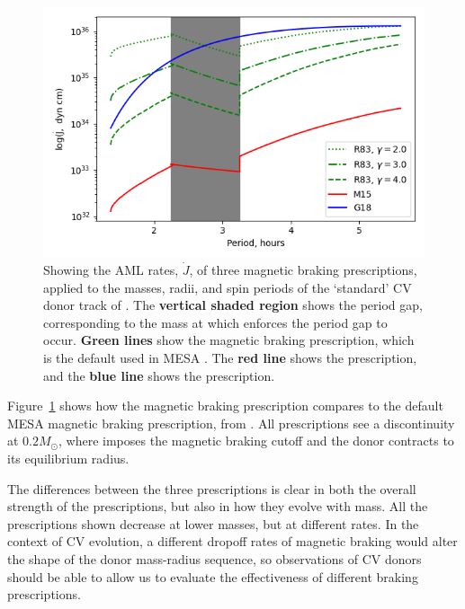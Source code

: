 \begin{figure}
    \centering
    \includegraphics[width=\textwidth, trim={1cm 0 0 0}]{figures/introduction/rappaport_garraffo_matt_magbraking_period.png}
    \caption{Showing the AML rates, $\dot J$, of three magnetic braking prescriptions, applied to the masses, radii, and spin periods of the `standard' CV donor track of \citet{knigge11}. The {\bf vertical shaded region} shows the period gap, corresponding to the mass at which \citet{knigge11} enforces the period gap to occur. {\bf Green lines} show the \citet{rappaport1983} magnetic braking prescription, which is the default used in MESA \citep{Paxton_2015}. The {\bf red line} shows the \citet{matt2015} prescription, and the {\bf blue line} shows the \citet{garraffo2018a} prescription.}
    \label{fig:introduction:rappaport garraffo matt magnetic braking}
\end{figure}

Figure~\ref{fig:introduction:rappaport garraffo matt magnetic braking} shows how the \citet{matt2015} magnetic braking prescription compares to the default MESA magnetic braking prescription, from \citet{rappaport1983}. All prescriptions see a discontinuity at $0.2M_\odot$, where \citet{knigge11} imposes the magnetic braking cutoff and the donor contracts to its equilibrium radius.

The differences between the three prescriptions is clear in both the overall strength of the prescriptions, but also in how they evolve with mass. All the prescriptions shown decrease at lower masses, but at different rates. In the context of CV evolution, a different dropoff rates of magnetic braking would alter the shape of the donor mass-radius sequence, so observations of CV donors should be able to allow us to evaluate the effectiveness of different braking prescriptions.

